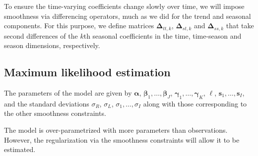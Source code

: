 \documentclass[ijds,nonblindrev]{informs-ijds}
\begin{document}
To ensure the time-varying coefficients change slowly over time, we will impose smoothness via differencing operators, much as we did for the trend and seasonal components. For this purpose, we define matrices \(\bm{\Delta}_{tt,k}\), \(\bm{\Delta}_{st,k}\) and \(\bm{\Delta}_{ss,k}\) that take second differences of the \(k\)th seasonal coefficients in the time, time-season and season dimensions, respectively.

\hypertarget{maximum-likelihood-estimation}{%
\subsection{Maximum likelihood estimation}\label{maximum-likelihood-estimation}}

\label{sec:STR_solution}

The parameters of the model are given by \(\bm{\alpha}\), \(\bm{\beta}_1,\dots,\bm{\beta}_J\), \(\bm{\gamma}_1,\dots,\bm{\gamma}_K\), \(\bm{\ell}\), \(\bm{s}_1,\dots,\bm{s}_I\), and the standard deviations \(\sigma_R\), \(\sigma_L\), \(\sigma_1,\dots,\sigma_I\) along with those corresponding to the other smoothness constraints.

The model is over-parametrized with more parameters than observations. However, the regularization via the smoothness constraints will allow it to be estimated.
\end{document}

